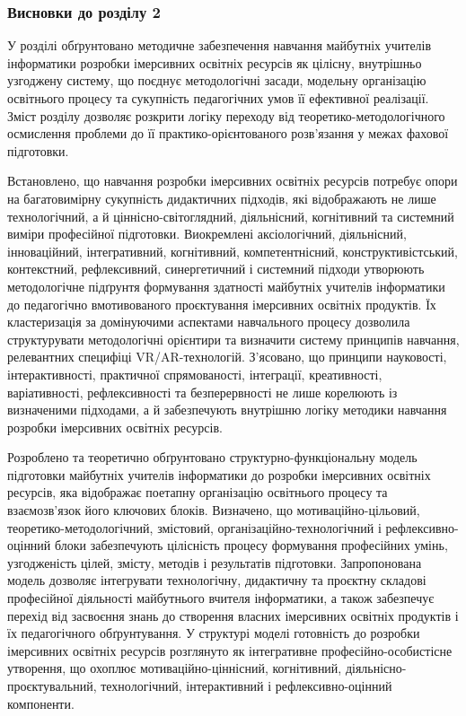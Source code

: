 \subsubsection{}\label{section}

\subsubsection{\texorpdfstring{\textbf{Висновки до розділу 2}}{Висновки до розділу 2}}\label{ux432ux438ux441ux43dux43eux432ux43aux438-ux434ux43e-ux440ux43eux437ux434ux456ux43bux443-2}

У розділі обґрунтовано методичне забезпечення навчання майбутніх учителів інформатики розробки імерсивних освітніх ресурсів як цілісну, внутрішньо узгоджену систему, що поєднує методологічні засади, модельну організацію освітнього процесу та сукупність педагогічних умов її ефективної реалізації. Зміст розділу дозволяє розкрити логіку переходу від теоретико-методологічного осмислення проблеми до її практико-орієнтованого розв'язання у межах фахової підготовки.

Встановлено, що навчання розробки імерсивних освітніх ресурсів потребує опори на багатовимірну сукупність дидактичних підходів, які відображають не лише технологічний, а й ціннісно-світоглядний, діяльнісний, когнітивний та системний виміри професійної підготовки. Виокремлені аксіологічний, діяльнісний, інноваційний, інтегративний, когнітивний, компетентнісний, конструктивістський, контекстний, рефлексивний, синергетичний і системний підходи утворюють методологічне підґрунтя формування здатності майбутніх учителів інформатики до педагогічно вмотивованого проєктування імерсивних освітніх продуктів. Їх кластеризація за домінуючими аспектами навчального процесу дозволила структурувати методологічні орієнтири та визначити систему принципів навчання, релевантних специфіці VR/AR-технологій. З'ясовано, що принципи науковості, інтерактивності, практичної спрямованості, інтеграції, креативності, варіативності, рефлексивності та безперервності не лише корелюють із визначеними підходами, а й забезпечують внутрішню логіку методики навчання розробки імерсивних освітніх ресурсів.

Розроблено та теоретично обґрунтовано структурно-функціональну модель підготовки майбутніх учителів інформатики до розробки імерсивних освітніх ресурсів, яка відображає поетапну організацію освітнього процесу та взаємозв'язок його ключових блоків. Визначено, що мотиваційно-цільовий, теоретико-методологічний, змістовий, організаційно-технологічний і рефлексивно-оцінний блоки забезпечують цілісність процесу формування професійних умінь, узгодженість цілей, змісту, методів і результатів підготовки. Запропонована модель дозволяє інтегрувати технологічну, дидактичну та проєктну складові професійної діяльності майбутнього вчителя інформатики, а також забезпечує перехід від засвоєння знань до створення власних імерсивних освітніх продуктів і їх педагогічного обґрунтування. У структурі моделі готовність до розробки імерсивних освітніх ресурсів розглянуто як інтегративне професійно-особистісне утворення, що охоплює мотиваційно-ціннісний, когнітивний, діяльнісно-проєктувальний, технологічний, інтерактивний і рефлексивно-оцінний компоненти.

